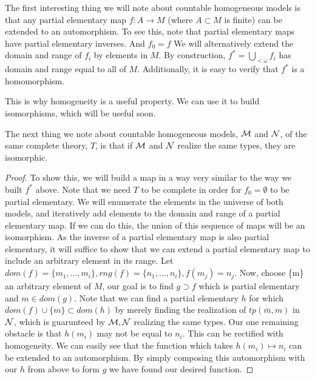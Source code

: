 The first interesting thing we will note about countable homogeneous models is that any partial elementary map \(f: A \to M\) (where \(A \subset M\) is finite) can be extended to an automorphism. 
To see this, note that partial elementary maps have partial elementary inverses. And \(f_0 = f\) %
We will alternatively extend the domain and range of \(f_i\) by elements in \(M\). 
By construction, \(f^* = \bigcup_{<\omega}f_i\) has domain and range equal to all of \(M\). %
Additionally, it is easy to verify that \(f^*\) is a homomorphism. 

This is why homogeneity is a useful property. We can use it to build isomorphisms, which will be useful soon. 

\begin{lemma}\label{lemma_types_isomorphism}
The next thing we note about countable homogeneous models, \(\mathcal{M}\) and \(\mathcal{N}\), of the same complete theory, \(T\), is that if \(\mathcal{M}\) and \(\mathcal{N}\) realize the same types, they are isomorphic.
\end{lemma}

\begin{proof}\label{proof_types_isomorphism}
To show this, we will build a map in a way very similar to the way we built \(f^*\) above. 
Note that we need \(T\) to be complete in order for \(f_0=\emptyset\) to be partial elementary.
We will enumerate the elements in the universe of both models, and iteratively add elements to the domain and range of a partial elementary map. 
If we can do this, the union of this sequence of maps will be an isomorphism.
As the inverse of a partial elementary map is also partial elementary, it will suffice to show that we can extend a partial elementary map to include an arbitrary element in its range. 
Let \(dom(f) = \{m_1, \ldots, m_i\}, rng(f) = \{n_1, \ldots, n_i\}, f(m_j) = n_j\).
Now, choose \{m\} an arbitrary element of \(M\), our goal is to find \(g \supset f\) which is partial elementary and \(m \in dom(g)\).
Note that we can find a partial elementary \(h\) for which \(dom(f) \cup \{m\} \subset dom(h)\) by merely finding the realization of \(tp(\bar{m}, m)\) in \(\mathcal{N}\), which is guarunteed by \(\mathcal{M}, \mathcal{N}\) realizing the same types. 
Our one remaining obstacle is that \(h(m_i)\) may not be equal to \(n_i\). 
This can be rectified with homogeneity. We can easily see that the function which takes \(h(m_i) \mapsto n_i\) can be extended to an automorphism. 
By simply composing this automorphism with our \(h\) from above to form \(g\) we have found our desired function. 
\end{proof}

